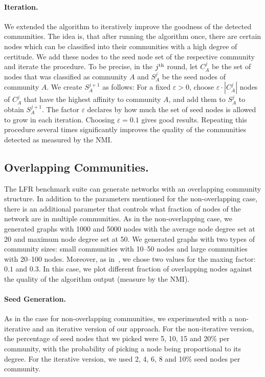 \paragraph{Iteration.}
We extended the algorithm to iteratively improve the goodness of the detected communities.
The idea is, that after running the algorithm once, there are certain nodes which can be classified 
into their communities with a high degree of certitude. We add these nodes to the seed node 
set of the respective community and iterate the procedure. To be precise, in the $j^{\textrm{th}}$ round, 
let $C^j_A$ be the set of nodes that was classified as community $A$ and $S^j_A$ 
be the seed nodes of community $A$. We create $S^{j+1}_A$ as follows: For a fixed $\varepsilon > 0$, 
choose $\varepsilon \cdot |C^j_A|$ nodes of $C^j_A$ that have the highest affinity to community $A$, 
and add them to $S^j_A$ to obtain $S^{j + 1}_A$. 
The factor $\varepsilon$ declares by how much the set of seed nodes is allowed to grow in each iteration. 
Choosing $\varepsilon = 0.1$ gives good results. Repeating this procedure several times significantly 
		improves the quality of the communities detected as measured by the NMI.

\subsection{Overlapping Communities.}
The LFR benchmark suite can generate networks with an overlapping community structure. 
In addition to the parameters mentioned for the non-overlapping case, there is an additional 
parameter that controls what fraction of nodes of the network are in multiple communities. 
As in the non-overlapping case, we generated graphs with 1000 and 5000 nodes with the average
node degree set at 20 and maximum node degree set at 50. We generated graphs with two types 
of community sizes: small communities with 10--50 nodes and large communities with 20--100 nodes.
Moreover, as in~\cite{LF09}, we chose two values for the maxing factor: $0.1$ and $0.3$. 
In this case, we plot different fraction of overlapping nodes against
the quality of the algorithm output (measure by the NMI).

\paragraph{Seed Generation.}
As in the case for non-overlapping communities, we experimented with a non-iterative 
and an iterative version of our approach. For the non-iterative version, the percentage 
of seed nodes that we picked were 5, 10, 15 and 20$\%$ per community, with the probability
of picking a node being proportional to its degree. For the iterative version, we used 
2, 4, 6, 8 and 10$\%$ seed nodes per community. 

